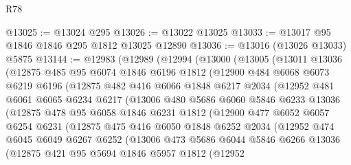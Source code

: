 \begin{lexlean}{R78}
\begin{coremodule}
@13025 := @13024 @295
@13026 := @13022 @13025
@13033 := @13017 @95 @1846 @1846 @295 @1812 @13025 @12890
@13036 := @13016 (@13026 @13033) @5875
@13144 := @12983
    (@12989
      (@12994
        (@13000
          (@13005
            (@13011
              @13036
              (@12875
                @485
                @95
                @6074
                @1846
                @6196
                @1812
                (@12900
                  @484
                  @6068
                  @6073
                  @6219
                  @6196
                  (@12875
                    @482
                    @416
                    @6066
                    @1848
                    @6217
                    @2034
                    (@12952
                      @481
                      @6061
                      @6065
                      @6234
                      @6217
                      (@13006
                        @480
                        @5686
                        @6060
                        @5846
                        @6233
                        @13036
                        (@12875
                          @478
                          @95
                          @6058
                          @1846
                          @6231
                          @1812
                          (@12900
                            @477
                            @6052
                            @6057
                            @6254
                            @6231
                            (@12875
                              @475
                              @416
                              @6050
                              @1848
                              @6252
                              @2034
                              (@12952
                                @474
                                @6045
                                @6049
                                @6267
                                @6252
                                (@13006
                                  @473
                                  @5686
                                  @6044
                                  @5846
                                  @6266
                                  @13036
                                  (@12875
                                    @421
                                    @95
                                    @5694
                                    @1846
                                    @5957
                                    @1812
                                    (@12952

\end{coremodule}
\end{lexlean}
